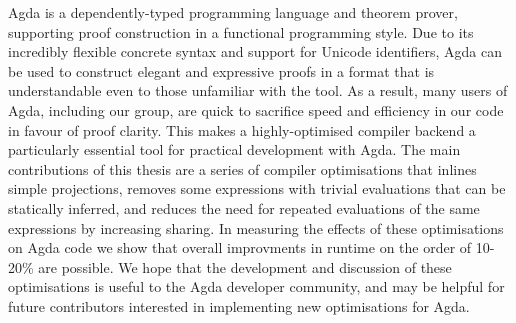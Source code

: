 Agda is a dependently-typed programming language and theorem prover, supporting proof construction in a functional programming style. Due to its incredibly flexible concrete syntax and support for Unicode identifiers, Agda can be used to construct elegant and expressive proofs in a format that is understandable even to those unfamiliar with the tool. As a result, many users of Agda, including our group, are quick to sacrifice speed and efficiency in our code in favour of proof clarity. This makes a highly-optimised compiler backend a particularly essential tool for practical development with Agda. The main contributions of this thesis are a series of compiler optimisations that inlines simple projections, removes some expressions with trivial evaluations that can be statically inferred, and reduces the need for repeated evaluations of the same expressions by increasing sharing. In measuring the effects of these optimisations on Agda code we show that overall improvments in runtime on the order of 10-20\% are possible. We hope that the development and discussion of these optimisations is useful to the Agda developer community, and may be helpful for future contributors interested in implementing new optimisations for Agda.
